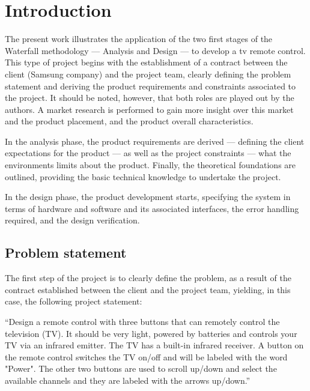 %
%
%
\chapter{Introduction}%
\label{ch:introduction}
The present work illustrates the application of the two first stages of the Waterfall methodology
--- Analysis and Design --- to develop a \gls{tv} remote control. This type of project
begins with the establishment of a contract between the client (Samsung company)
and the project team, clearly defining the problem statement and deriving the
product requirements and constraints associated to the project. It should be
noted, however, that both roles are played out by the authors.
A market
research is performed to gain more insight over this market and the
product placement, and the product overall characteristics.

In the analysis
phase, the product requirements are derived --- defining the client expectations
for the product --- as well as the project constraints --- what the environments
limits about the product. Finally, the theoretical foundations are outlined,
providing the basic technical knowledge to undertake the project.

In the design phase, the product development starts, specifying the system in
terms of hardware and software and its associated interfaces, the error handling
required, and the design verification.

\section{Problem statement}
\label{sec:prob-stat}
The first step of the project is to clearly define the problem, as a result of
the contract established between the client and the project team, yielding, in
this case, the following project statement:

``Design a remote control with three buttons that can
remotely control the television (TV). It should be very
light, powered by batteries and controls your TV via an
infrared emitter. The TV has a built-in infrared receiver. A
button on the remote control switches the TV on/off and
will be labeled with the word "Power". The other two
buttons are used to scroll up/down and select the available
channels and they are labeled with the arrows up/down.''


